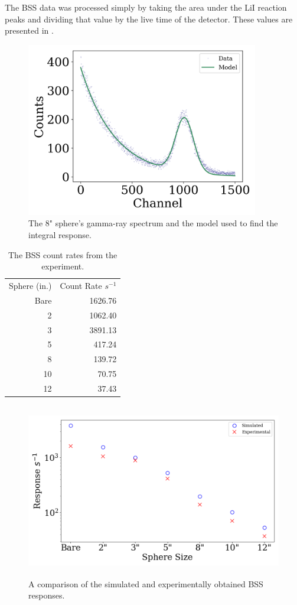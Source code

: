 The BSS data was processed simply by taking the area under the LiI reaction peaks and dividing that value by the live time of the detector.
These values are presented in .

\begin{figure}[htb]
\centering
\includegraphics[height=3in]{tex/figures/bs4_spectrum.png}
\caption[8" BSS Spectrum]{The 8" sphere's gamma-ray spectrum and the model used to find the integral response.}
\label{fig:bs4_spectrum}
\end{figure}


\begin{table}[h]\centering
\label{tab:bss}
\caption{The BSS count rates from the experiment.}
\begin{tabular}{ r | r }
\toprule
Sphere (in.)  & Count Rate $s^{-1}$\\
Bare & 1626.76\\
2  & 1062.40\\
3 & 3891.13\\
5 & 417.24\\
8 & 139.72\\
10 & 70.75\\
12 & 37.43\\
\end{tabular}
\end{table}

\begin{figure}[htb]
\centering
\includegraphics[height=3in]{tex/figures/compare_countrates.png}
\caption[BSS Responses]{A comparison of the simulated and experimentally obtained BSS responses.}
\label{fig:compare_countrates}
\end{figure}


